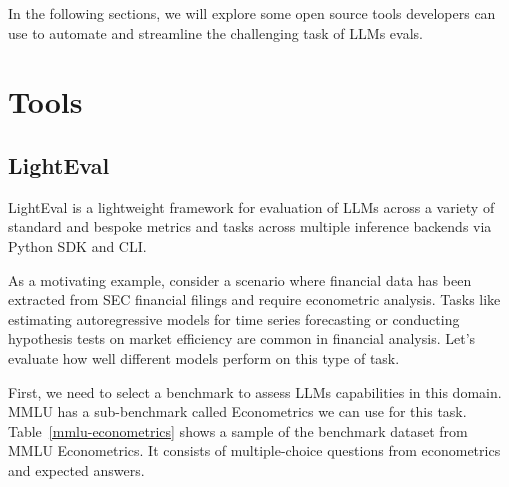 In the following sections, we will explore some open source tools developers can use to automate and streamline the challenging task of LLMs evals.
\section{Tools}

\subsection{LightEval}

LightEval  is a lightweight framework for evaluation of LLMs across a variety of standard and bespoke metrics and tasks across multiple inference backends via Python SDK and CLI.

As a motivating example, consider a scenario where financial data has been extracted from SEC financial filings and require econometric analysis. Tasks like estimating autoregressive models for time series forecasting or conducting hypothesis tests on market efficiency are common in financial analysis. Let's evaluate how well different models perform on this type of task.

First, we need to select a benchmark to assess LLMs capabilities in this domain. MMLU has a sub-benchmark called Econometrics we can use for this task. Table~\ref{mmlu-econometrics} shows a sample of the benchmark dataset from MMLU Econometrics. It consists of multiple-choice questions from econometrics and expected answers.

